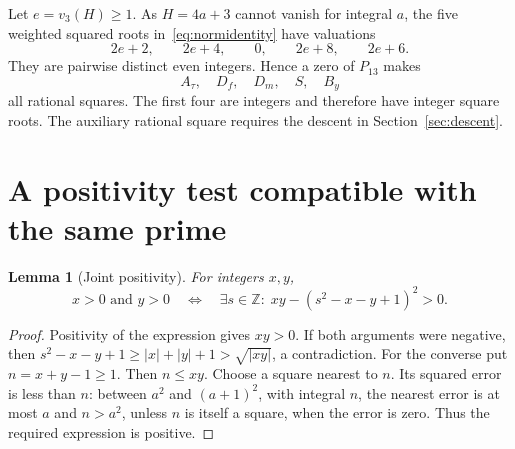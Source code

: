\documentclass[11pt]{article}
\newtheorem{lemma}[theorem]{Lemma}
\theoremstyle{remark}\newtheorem{remark}[theorem]{Remark}
\newcommand{\Z}{\mathbb Z}\newcommand{\Q}{\mathbb Q}\newcommand{\N}{\mathbb N}
\begin{document}
Let $e=v_3(H)\ge1$. As $H=4a+3$ cannot vanish for integral $a$, the
five weighted squared roots in~\eqref{eq:normidentity} have valuations
\[
 2e+2,\qquad2e+4,\qquad0,\qquad2e+8,\qquad2e+6.
\]
They are pairwise distinct even integers. Hence a zero of $P_{13}$ makes
\[
 A_\tau,\quad D_f,\quad D_m,\quad S,\quad B_y
\]
all rational squares. The first four are integers and therefore have
integer square roots. The auxiliary rational square requires the descent
in Section~\ref{sec:descent}.

\section{A positivity test compatible with the same prime}\label{sec:positivity}

\begin{lemma}[Joint positivity]\label{lem:joint}
For integers $x,y$,
\[
 x>0\text{ and }y>0
 \quad\Longleftrightarrow\quad
 \exists s\in\Z:\;xy-(s^2-x-y+1)^2>0.
\]
\end{lemma}
\begin{proof}
Positivity of the expression gives $xy>0$. If both arguments were
negative, then $s^2-x-y+1\ge |x|+|y|+1>\sqrt{|xy|}$, a contradiction.
For the converse put $n=x+y-1\ge1$. Then $n\le xy$. Choose a square
nearest to $n$. Its squared error is less than $n$: between $a^2$ and
$(a+1)^2$, with integral $n$, the nearest error is at most $a$ and
$n>a^2$, unless $n$ is itself a square, when the error is zero. Thus the
required expression is positive.
\end{proof}
\end{document}
